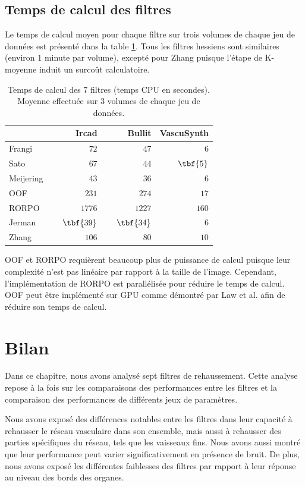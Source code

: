 \subsection{Temps de calcul des filtres}
Le temps de calcul moyen pour chaque filtre sur trois volumes de chaque jeu de données est présenté dans la table \ref{tab:Computation time benchmark}. Tous les filtres hessiens sont similaires (environ 1 minute par volume), excepté pour Zhang puisque l'étape de K-moyenne induit un surcoût calculatoire.
\begin{table}
  \centering
  \caption{Temps de calcul des 7 filtres (temps CPU en secondes). Moyenne effectuée sur 3 volumes de chaque jeu de données.}
  \label{tab:Computation time benchmark}
  \begin{tabular}{lrrr}
  \hline
                     & Ircad      & Bullit  & VascuSynth \\
                     \hline
  Frangi    & ~~~~~~~~~$72$  & ~~~~~~~~~$47$   & ~~~~~~~~~$6$   \\
  Sato      & $67$  & $44$   & $\tbf{5}$   \\
  Meijering & $43$  & $36$   & $6$   \\
  OOF       & $231$  & $274$   & $17$   \\
  RORPO     & $1776$  & $1227$   & $160$   \\
  Jerman    & $\tbf{39}$  & $\tbf{34}$   & $6$   \\
  Zhang     & $106$  & $80$   & $10$  \\
  \hline
  \end{tabular}
\end{table}

OOF et RORPO requièrent beaucoup plus de puissance de calcul puisque leur complexité n'est pas linéaire par rapport à la taille de l'image. Cependant, l'implémentation de RORPO est parallélisée pour réduire le temps de calcul. OOF peut être implémenté sur GPU comme démontré par Law et al. \cite{Law2009_efficient_implementation} afin de réduire son temps de calcul.
\section{Bilan}
Dans ce chapitre, nous avons analysé sept filtres de rehaussement. Cette analyse repose à la fois sur les comparaisons des performances entre les filtres et la comparaison des performances de différents jeux de paramètres. 

Nous avons exposé des différences notables entre les filtres dans leur capacité à rehausser le réseau vasculaire dans son ensemble, mais aussi à rehausser des parties spécifiques du réseau, tels que les vaisseaux fins. Nous avons aussi montré que leur performance peut varier significativement en présence de bruit. De plus, nous avons exposé les différentes faiblesses des filtres par rapport à leur réponse au niveau des bords des organes.

